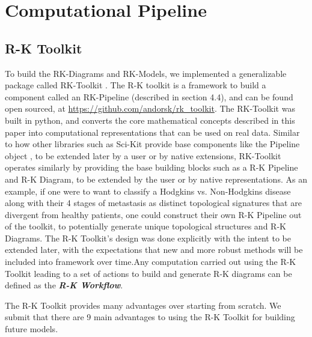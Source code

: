 \section{Computational Pipeline}

\subsection{R-K Toolkit}

 To build the RK-Diagrams and RK-Models, we implemented a generalizable package called RK-Toolkit \cite{rktoolkit}. The R-K toolkit is a framework to build a component called an RK-Pipeline (described in section 4.4), and can be found open sourced, at \url{https://github.com/andorsk/rk_toolkit}. The RK-Toolkit was built in python, and converts the core mathematical concepts described in this paper into computational representations that can be used on real data. Similar to how other libraries such as Sci-Kit \cite{a2021_scikitlearn} provide base components like the Pipeline object \cite{a2021_61}, to be extended later by a user or by native extensions, RK-Toolkit operates similarly by providing the base building blocks such as a R-K Pipeline and R-K Diagram, to be extended by the user or by native representations. As an example, if one were to want to classify a Hodgkins vs. Non-Hodgkins disease along with their 4 stages of metastasis as distinct topological signatures that are divergent from healthy patients, one could construct their own R-K Pipeline out of the toolkit, to potentially generate unique topological structures and R-K Diagrams. The R-K Toolkit's design was done explicitly with the intent to be extended later, with the expectations that new and more robust methods will be included into framework over time.Any computation carried out using the R-K Toolkit leading to a set of actions to build and generate R-K diagrams can be defined as the \textbf{\textit{R-K Workflow}}.

The R-K Toolkit provides many advantages over starting from scratch. We submit that there are 9 main advantages to using the R-K Toolkit for building future models.

